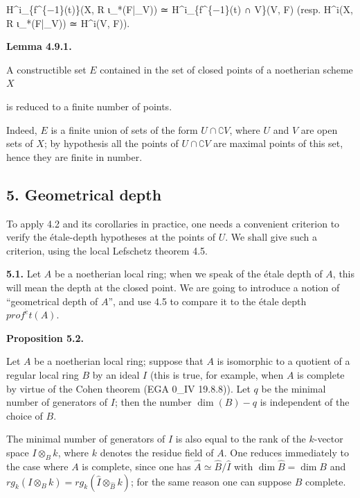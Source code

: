 \documentclass[
]{article}
\newenvironment{Shaded}{}{}
\newcommand{\NormalTok}[1]{#1}
\begin{document}
\begin{Shaded}
\begin{Highlighting}[]
\NormalTok{H\^{}i\_\{f\^{}\{−1\}(t)\}(X, R ι\_*(F|\_V)) ≃ H\^{}i\_\{f\^{}\{−1\}(t) ∩ V\}(V, F)  (resp. H\^{}i(X, R ι\_*(F|\_V)) ≃ H\^{}i(V, F)).}
\end{Highlighting}
\end{Shaded}

\textbf{Lemma 4.9.1.}

A constructible set \(E\) contained in the set of closed points of a
noetherian scheme \(X\)

is reduced to a finite number of points.

Indeed, \(E\) is a finite union of sets of the form
\(U \cap \complement V\), where \(U\) and \(V\) are open sets of \(X\);
by hypothesis all the points of \(U \cap \complement V\) are maximal
points of this set, hence they are finite in number.

\subsection{5. Geometrical depth}\label{geometrical-depth}

To apply 4.2 and its corollaries in practice, one needs a convenient
criterion to verify the étale-depth hypotheses at the points of \(U\).
We shall give such a criterion, using the local Lefschetz theorem 4.5.

\textbf{5.1.} Let \(A\) be a noetherian local ring; when we speak of the
étale depth of \(A\), this will mean the depth at the closed point. We
are going to introduce a notion of ``geometrical depth of \(A\)'', and
use 4.5 to compare it to the étale depth \(prof^{\acute{e}}t(A)\).

\textbf{Proposition 5.2.}

Let \(A\) be a noetherian local ring; suppose that \(A\) is isomorphic
to a quotient of a regular local ring \(B\) by an ideal \(I\) (this is
true, for example, when \(A\) is complete by virtue of the Cohen theorem
(EGA 0\_IV 19.8.8)). Let \(q\) be the minimal number of generators of
\(I\); then the number \(\dim(B) - q\) is independent of the choice of
\(B\).

The minimal number of generators of \(I\) is also equal to the rank of
the \(k\)-vector space \(I \otimes_{B} k\), where \(k\) denotes the
residue field of \(A\). One reduces immediately to the case where \(A\)
is complete, since one has \(\hat{A} \simeq \hat{B}/\hat{I}\) with
\(\dim \hat{B} = \dim B\) and
\(rg_{k}(I \otimes_{B} k) = rg_{k}(\hat{I} \otimes_{\hat{B}} k)\); for
the same reason one can suppose \(B\) complete.
\end{document}
